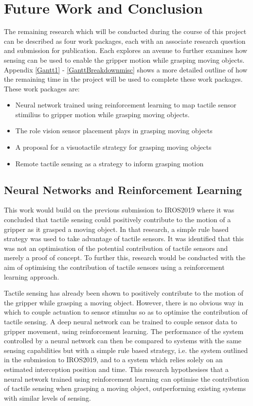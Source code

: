 \chapter{Future Work and Conclusion}

The remaining research which will be conducted during the course of this project can be described as four work packages, each with an associate research question and submission for publication. Each explores an avenue to further examines how sensing can be used to enable the gripper motion while grasping moving objects. Appendix \ref{Gantt1} - \ref{GanttBreakdownmisc} shows a more detailed outline of how the remaining time in the project will be used to complete these work packages. These work packages are:
\begin{itemize}
    \item Neural network trained using reinforcement learning to map tactile sensor stimilius to gripper motion while grasping moving objects.
    \item The role vision sensor placement plays in grasping moving objects
    \item A proposal for a visuotactile strategy for grasping moving objects
    \item Remote tactile sensing as a strategy to inform grasping motion
\end{itemize}

\section{Neural Networks and Reinforcement Learning} \label{RL}


This work would build on the previous submission to IROS2019 where it was concluded that tactile sensing could positively contribute to the motion of a gripper as it grasped a moving object. In that research, a simple rule based strategy was used to take advantage of tactile sensors. It was identified that this was not an optimisation of the potential contribution of tactile sensors and merely a proof of concept. To further this, research would be conducted with the aim of optimising the contribution of tactile sensors using a reinforcement learning approach.

Tactile sensing has already been shown to positively contribute to the motion of the gripper while grasping a moving object. However, there is no obvious way in which to couple actuation to sensor stimulus so as to optimise the contribution of tactile sensing. A deep neural network can be trained to couple sensor data to gripper movement, using reinforcement learning. The performance of the system controlled by a neural network can then be compared to systems with the same sensing capabilities but with a simple rule based strategy, i.e. the system outlined in the submission to IROS2019, and to a system which relies solely on an estimated interception position and time. This research hypothesises that a neural network trained using reinforcement learning can optimise the contribution of tactile sensing when grasping a moving object, outperforming existing systems with similar levels of sensing.


